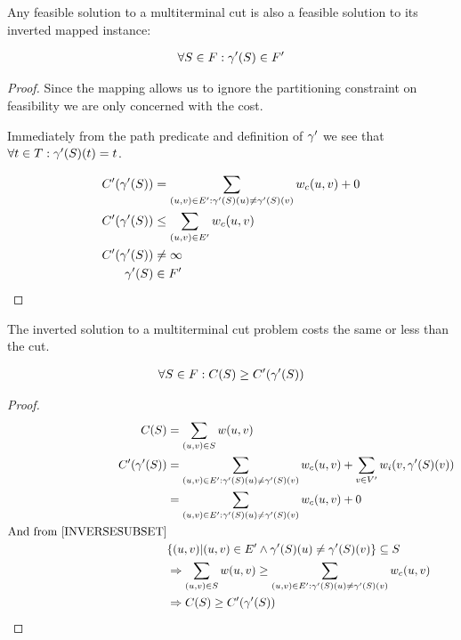 \begin{lemma}
\label{INVERSEFEASIBLE}
Any feasible solution to a multiterminal cut is also a feasible solution to its inverted mapped instance:

\begin{align}
	\nonumber \forall S \in F : \gamma'(S) \in F'
\end{align}
\end{lemma}
\begin{proof}
Since the mapping allows us to ignore the partitioning constraint on feasibility we are only concerned with the cost.

Immediately from the path predicate and definition of $\gamma'$ we see that $\forall t \in T : \gamma'(S)(t) = t$.

\begin{align}
	\nonumber C'(\gamma'(S)) & = \displaystyle\sum\limits_{(u,v) \in E' : \gamma'(S)(u) \neq \gamma'(S)(v)} w_c(u,v) + 0 \\
	\nonumber C'(\gamma'(S)) & \leq \displaystyle\sum\limits_{(u,v) \in E'} w_c(u,v) \\
	\nonumber C'(\gamma'(S)) & \neq \infty \\
	\nonumber \gamma'(S) & \in F'
\end{align}
\end{proof}

\begin{lemma}
\label{INVERSECOST}
The inverted solution to a multiterminal cut problem costs the same or less than the cut.

\begin{align}
	\nonumber \forall S \in F : C(S) \geq C'(\gamma'(S))
\end{align}
\end{lemma}
\begin{proof}
\begin{align}
	\nonumber C(S) & = \displaystyle\sum\limits_{(u,v) \in S} w(u,v)\\
	\nonumber C'(\gamma'(S)) & = \displaystyle\sum\limits_{(u,v) \in E' : \gamma'(S)(u) \neq \gamma'(S)(v)} w_c(u,v) + \displaystyle\sum\limits_{v \in V'} w_i(v, \gamma'(S)(v)) \\
	\nonumber & = \displaystyle\sum\limits_{(u,v) \in E' : \gamma'(S)(u) \neq \gamma'(S)(v)} w_c(u,v) + 0 \\
	\nonumber \mbox{And from \ref{INVERSESUBSET}} \\
	\nonumber & \{(u,v) | (u,v) \in E' \wedge \gamma'(S)(u) \neq \gamma'(S)(v)\} \subseteq S \\
	\nonumber & \Rightarrow \displaystyle\sum\limits_{(u,v) \in S} w(u,v) \geq \displaystyle\sum\limits_{(u,v) \in E' : \gamma'(S)(u) \neq \gamma'(S)(v)} w_c(u,v) \\
	\nonumber & \Rightarrow C(S) \geq C'(\gamma'(S))
\end{align}
\end{proof}

